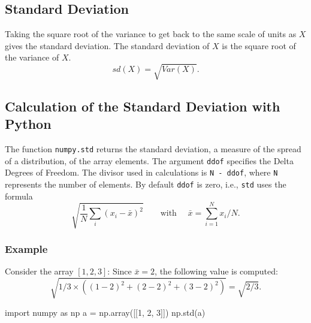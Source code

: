 \documentclass[
  letterpaper,
  DIV=11,
  numbers=noendperiod]{scrreprt}
\newenvironment{Shaded}{\begin{snugshade}}{\end{snugshade}}
\newcommand{\DecValTok}[1]{\textcolor[rgb]{0.68,0.00,0.00}{#1}}
\newcommand{\ImportTok}[1]{\textcolor[rgb]{0.00,0.46,0.62}{#1}}
\newcommand{\NormalTok}[1]{\textcolor[rgb]{0.00,0.23,0.31}{#1}}
\newcommand{\OperatorTok}[1]{\textcolor[rgb]{0.37,0.37,0.37}{#1}}
\begin{document}
\hypertarget{standard-deviation}{%
\subsection{Standard Deviation}\label{standard-deviation}}

Taking the square root of the variance to get back to the same scale of
units as \(X\) gives the standard deviation. The standard deviation of
\(X\) is the square root of the variance of \(X\). \begin{equation}
sd(X) = \sqrt{Var(X)}.
\end{equation}

\hypertarget{calculation-of-the-standard-deviation-with-python}{%
\subsection{Calculation of the Standard Deviation with
Python}\label{calculation-of-the-standard-deviation-with-python}}

The function \texttt{numpy.std} returns the standard deviation, a
measure of the spread of a distribution, of the array elements. The
argument \texttt{ddof} specifies the Delta Degrees of Freedom. The
divisor used in calculations is \texttt{N\ -\ ddof}, where \texttt{N}
represents the number of elements. By default \texttt{ddof} is zero,
i.e., \texttt{std} uses the formula
\begin{equation}  \sqrt{  \frac{1}{N} \sum_i \left( x_i - \bar{x} \right)^2  } \qquad \text{with } \quad \bar{x} = \sum_{i=1}^N x_i /N. \end{equation}

\hypertarget{example-1}{%
\subsubsection{Example}\label{example-1}}

Consider the array \([1,2,3]\): Since \(\bar{x} = 2\), the following
value is computed:
\[ \sqrt{1/3 \times \left( (1-2)^2 + (2-2)^2 + (3-2)^2  \right)} = \sqrt{2/3}.\]

\begin{Shaded}
\begin{Highlighting}[]
\ImportTok{import}\NormalTok{ numpy }\ImportTok{as}\NormalTok{ np}
\NormalTok{a }\OperatorTok{=}\NormalTok{ np.array([[}\DecValTok{1}\NormalTok{, }\DecValTok{2}\NormalTok{, }\DecValTok{3}\NormalTok{]])}
\NormalTok{np.std(a)}
\end{Highlighting}
\end{Shaded}
\end{document}
